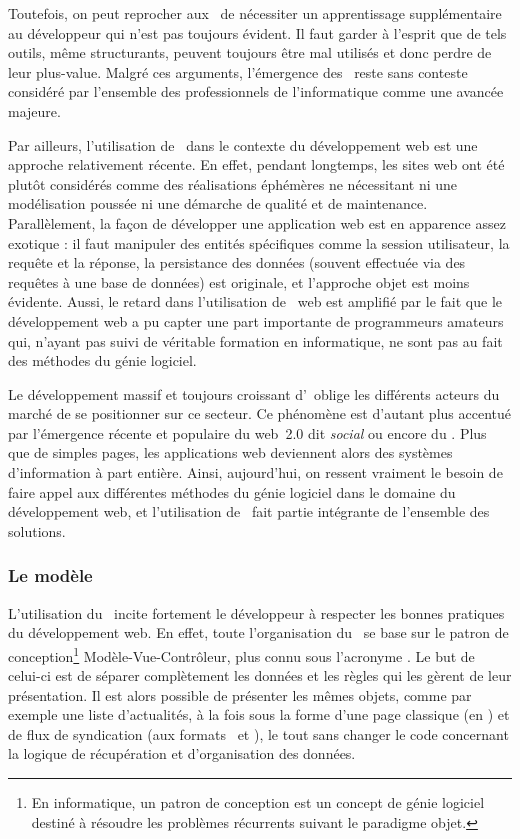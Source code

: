 Toutefois, on peut reprocher aux \afms\ de nécessiter un apprentissage supplémentaire au développeur qui n'est pas toujours évident. Il faut garder à l'esprit que de tels outils, même structurants, peuvent toujours être mal utilisés et donc perdre de leur plus-value. Malgré ces arguments, l'émergence des \afms\ reste sans conteste considéré par l'ensemble des professionnels de l'informatique comme une avancée majeure.

Par ailleurs, l'utilisation de \afms\ dans le contexte du développement web est une approche relativement récente. En effet, pendant longtemps, les sites web ont été plutôt considérés comme des réalisations éphémères ne nécessitant ni une modélisation poussée ni une démarche de qualité et de maintenance. Parallèlement, la façon de développer une application web est en apparence assez exotique : il faut manipuler des entités spécifiques comme la session utilisateur, la requête et la réponse, la persistance des données (souvent effectuée via des requêtes à une base de données) est originale, et l'approche objet est moins évidente. Aussi, le retard dans l'utilisation de \afms\ web est amplifié par le fait que le développement web a pu capter une part importante de programmeurs amateurs qui, n'ayant pas suivi de véritable formation en informatique, ne sont pas au fait des méthodes du génie logiciel.

Le développement massif et toujours croissant d'\ainternet\ oblige les dif\-fé\-rents acteurs du marché de se positionner sur ce secteur. Ce phénomène est d'autant plus accentué par l'émergence récente et populaire du web~2.0\cite{webdeux} dit \emph{social} ou encore du \acloud\cite{cloud}. Plus que de simples pages, les applications web deviennent alors des systèmes d'information à part entière. Ainsi, aujourd'hui, on ressent vraiment le besoin de faire appel aux différentes méthodes du génie logiciel dans le domaine du développement web, et l'utilisation de \afm\ fait partie intégrante de l'ensemble des solutions.


\subsubsection{Le modèle \amvc}

L'utilisation du \asf\ incite fortement le développeur à respecter les bonnes pratiques du développement web. En effet, toute l'organisation du \afm\ se base sur le patron de conception\footnote{En informatique, un patron de conception est un concept de génie logiciel destiné à résoudre les problèmes récurrents suivant le paradigme objet.\cite{designpattern}} Modèle-Vue-Contrôleur, plus connu sous l'acronyme \amvc. Le but de celui-ci est de séparer complètement les données et les
règles qui les gèrent de leur présentation. Il est alors possible de présenter les mêmes objets, comme par exemple une liste d'actualités, à la fois sous la forme d'une page classique (en \ahtml) et de flux de syndication (aux formats \arss\ et \aatom), le tout sans changer le code concernant la logique de récupération et d'organisation des données.

